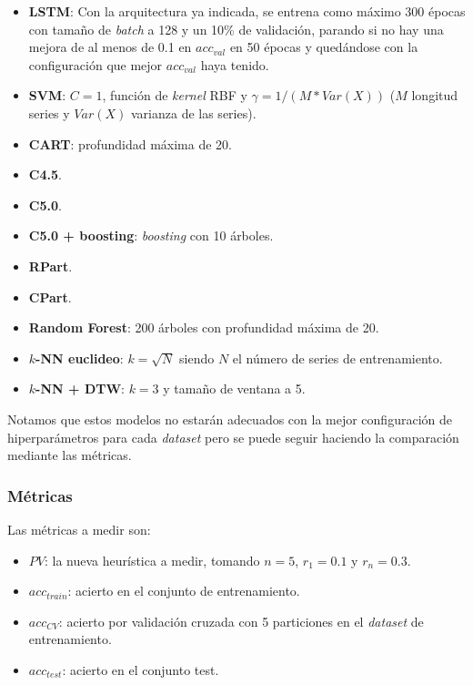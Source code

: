 \begin{itemize}
  \item \textbf{LSTM}: Con la arquitectura ya indicada, se entrena como máximo 300 épocas con tamaño de \emph{batch} a 128 y un 10\% de validación, parando si no hay una mejora de al menos de 0.1 en $acc_{val}$ en 50 épocas y quedándose con la configuración que mejor $acc_{val}$ haya tenido.
  \item \textbf{SVM}: $C = 1$, función de \emph{kernel} RBF y $\gamma = 1 / (M * Var(X))$ ($M$ longitud series y $Var(X)$ varianza de las series).
  \item \textbf{CART}: profundidad máxima de 20.
  \item \textbf{C4.5}.
  \item \textbf{C5.0}.
  \item \textbf{C5.0 + boosting}: \emph{boosting} con 10 árboles.
  \item \textbf{RPart}.
  \item \textbf{CPart}.
  \item \textbf{Random Forest}: 200 árboles con profundidad máxima de 20.
  \item \textbf{$k$-NN euclideo}: $k = \sqrt{N}$ siendo $N$ el número de series de entrenamiento.
  \item \textbf{$k$-NN + DTW}: $k = 3$ y tamaño de ventana a 5.
\end{itemize}

Notamos que estos modelos no estarán adecuados con la mejor configuración de hiperparámetros para cada \emph{dataset} pero se puede seguir haciendo la comparación mediante las métricas.

\subsubsection{Métricas}

Las métricas a medir son:

\begin{itemize}
  \item $PV$: la nueva heurística a medir, tomando $n = 5$, $r_1 = 0.1$ y $r_n = 0.3$.
  \item $acc_{train}$: acierto en el conjunto de entrenamiento.
  \item $acc_{CV}$: acierto por validación cruzada con 5 particiones en el \emph{dataset} de entrenamiento.
  \item $acc_{test}$: acierto en el conjunto test.
\end{itemize}

